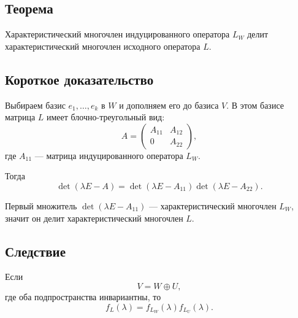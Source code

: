\documentclass[12pt,a4paper]{article}
\begin{document}
\subsection*{Теорема}

Характеристический многочлен индуцированного оператора $L_W$ делит характеристический многочлен исходного оператора $L$.

\subsection*{Короткое доказательство}

Выбираем базис $e_1,\ldots,e_k$ в $W$ и дополняем его до базиса $V$. В этом базисе матрица $L$ имеет блочно-треугольный вид:
\[
    A=
    \begin{pmatrix}
        A_{11} & A_{12}\\
        0 & A_{22}
    \end{pmatrix},
\]
где $A_{11}$ --- матрица индуцированного оператора $L_W$.

Тогда
\[
    \det(\lambda E-A)
    =
    \det(\lambda E-A_{11})\det(\lambda E-A_{22}).
\]

Первый множитель $\det(\lambda E-A_{11})$ --- характеристический многочлен $L_W$, значит он делит характеристический многочлен $L$.

\subsection*{Следствие}

Если
\[
    V=W\oplus U,
\]
где оба подпространства инвариантны, то
\[
    f_L(\lambda)=f_{L_W}(\lambda)f_{L_U}(\lambda).
\]
\end{document}
